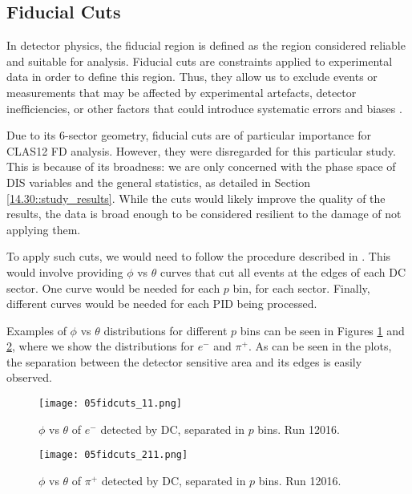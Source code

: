 \subsection{Fiducial Cuts}
\label{20.05::fiducial_cuts}
    In detector physics, the fiducial region is defined as the region considered reliable and suitable for analysis.
    Fiducial cuts are constraints applied to experimental data in order to define this region.
    Thus, they allow us to exclude events or measurements that may be affected by experimental artefacts, detector inefficiencies, or other factors that could introduce systematic errors and biases \cite{leo1987}.

    Due to its 6-sector geometry, fiducial cuts are of particular importance for CLAS12 FD analysis.
    However, they were disregarded for this particular study.
    This is because of its broadness: we are only concerned with the phase space of DIS variables and the general statistics, as detailed in Section \ref{14.30::study_results}.
    While the cuts would likely improve the quality of the results, the data is broad enough to be considered resilient to the damage of not applying them.

    To apply such cuts, we would need to follow the procedure described in \cite{zana2010}.
    This would involve providing $\phi$ vs $\theta$ curves that cut all events at the edges of each DC sector.
    One curve would be needed for each $p$ bin, for each sector.
    Finally, different curves would be needed for each PID being processed.

    Examples of $\phi$ vs $\theta$ distributions for different $p$ bins can be seen in Figures \ref{fig::20.05::fiducial_cuts_pid11} and \ref{fig::20.05::fiducial_cuts_pid211}, where we show the distributions for $e^-$ and $\pi^+$.
    As can be seen in the plots, the separation between the detector sensitive area and its edges is easily observed.

    \begin{figure}
        \centering
        \texttt{[image: 05fidcuts\_11.png]}
        \caption[$\phi$ vs $\theta$ of $e^-$ in $p$ bins]
        {$\phi$ vs $\theta$ of $e^-$ detected by DC, separated in $p$ bins.
        Run 12016.}
        \label{fig::20.05::fiducial_cuts_pid11}
    \end{figure}

    \begin{figure}
        \centering
        \texttt{[image: 05fidcuts\_211.png]}
        \caption[$\phi$ vs $\theta$ of $\pi^+$ in $p$ bins]
        {$\phi$ vs $\theta$ of $\pi^+$ detected by DC, separated in $p$ bins.
        Run 12016.}
        \label{fig::20.05::fiducial_cuts_pid211}
    \end{figure}
